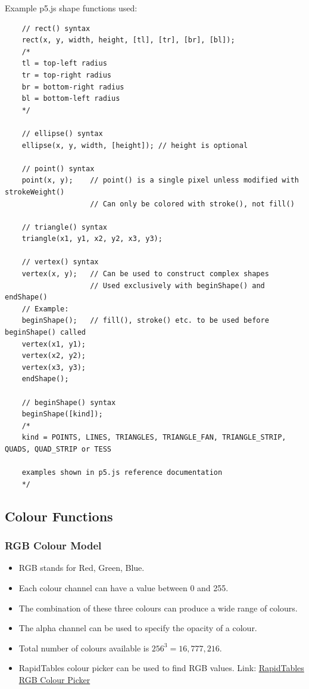 \documentclass{article}
\begin{document}
\noindent Example p5.js shape functions used:

\begin{verbatim}
    // rect() syntax
    rect(x, y, width, height, [tl], [tr], [br], [bl]);
    /*
    tl = top-left radius
    tr = top-right radius
    br = bottom-right radius
    bl = bottom-left radius
    */

    // ellipse() syntax
    ellipse(x, y, width, [height]); // height is optional
    
    // point() syntax
    point(x, y);    // point() is a single pixel unless modified with strokeWeight()
                    // Can only be colored with stroke(), not fill()
    
    // triangle() syntax
    triangle(x1, y1, x2, y2, x3, y3);

    // vertex() syntax
    vertex(x, y);   // Can be used to construct complex shapes
                    // Used exclusively with beginShape() and endShape()
    // Example:
    beginShape();   // fill(), stroke() etc. to be used before beginShape() called
    vertex(x1, y1);  
    vertex(x2, y2);
    vertex(x3, y3);
    endShape();

    // beginShape() syntax
    beginShape([kind]);
    /*
    kind = POINTS, LINES, TRIANGLES, TRIANGLE_FAN, TRIANGLE_STRIP, QUADS, QUAD_STRIP or TESS

    examples shown in p5.js reference documentation
    */

    \end{verbatim}

\newpage
\subsection*{Colour Functions}
\subsubsection*{RGB Colour Model}
\begin{itemize}
    \item RGB stands for Red, Green, Blue.
    \item Each colour channel can have a value between 0 and 255.
    \item The combination of these three colours can produce a wide range of colours.
    \item The alpha channel can be used to specify the opacity of a colour.
    \item Total number of colours available is $256^3 = 16,777,216$.
    \item RapidTables colour picker can be used to find RGB values. Link: \href{https://www.rapidtables.com/web/color/RGB_Color.html}{RapidTables RGB Colour Picker}
\end{itemize}
\end{document}
